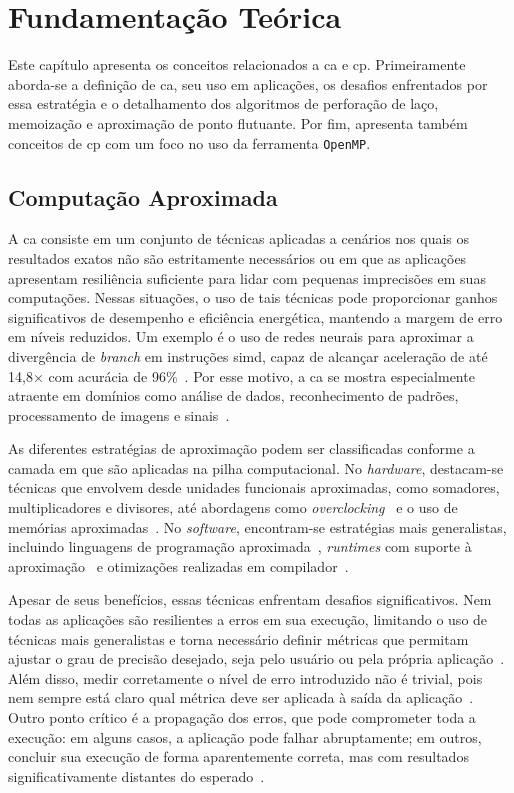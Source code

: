 \chapter{Fundamentaç\~ao Te\'orica}\label{cap:fundamentacaoTeorica}

Este capítulo apresenta os conceitos relacionados a \gls{ca} e \gls{cp}. Primeiramente aborda-se a definição de \gls{ca}, seu uso em aplicações, os desafios enfrentados por essa estratégia e o detalhamento dos algoritmos de perforação de laço, memoização e aproximação de ponto flutuante. Por fim, apresenta também conceitos de \gls{cp} com um foco no uso da ferramenta \texttt{OpenMP}.

\section{Computação Aproximada}\label{sec:compAprox}

A \gls{ca} consiste em um conjunto de técnicas aplicadas a cenários nos quais os resultados exatos não são estritamente necessários ou em que as aplicações apresentam resiliência suficiente para lidar com pequenas imprecisões em suas computações. Nessas situações, o uso de tais técnicas pode proporcionar ganhos significativos de desempenho e eficiência energética, mantendo a margem de erro em níveis reduzidos. Um exemplo é o uso de redes neurais para aproximar a divergência de \textit{branch} em instruções \gls{simd}, capaz de alcançar aceleração de até 14,8$\times$ com acurácia de 96\%~\cite{grigorian2015}. Por esse motivo, a \gls{ca} se mostra especialmente atraente em domínios como análise de dados, reconhecimento de padrões, processamento de imagens e sinais~\cite{mittal2016, chippa2013}.

As diferentes estratégias de aproximação podem ser classificadas conforme a camada em que são aplicadas na pilha computacional. No \textit{hardware}, destacam-se técnicas que envolvem desde unidades funcionais aproximadas, como somadores, multiplicadores e divisores, até abordagens como \textit{overclocking}~\cite{leon2025a,leon2025b} e o uso de memórias aproximadas~\cite{fabricio2020}. No \textit{software}, encontram-se estratégias mais generalistas, incluindo linguagens de programação aproximada~\cite{sampson2015}, \textit{runtimes} com suporte à aproximação~\cite{li2018,reis2024} e otimizações realizadas em compilador~\cite{oliveira2024a,oliveira2024b}.

Apesar de seus benefícios, essas técnicas enfrentam desafios significativos. Nem todas as aplicações são resilientes a erros em sua execução, limitando o uso de técnicas mais generalistas e torna necessário definir métricas que permitam ajustar o grau de precisão desejado, seja pelo usuário ou pela própria aplicação~\cite{mittal2016}. Além disso, medir corretamente o nível de erro introduzido não é trivial, pois nem sempre está claro qual métrica deve ser aplicada à saída da aplicação~\cite{felzmann2021}. Outro ponto crítico é a propagação dos erros, que pode comprometer toda a execução: em alguns casos, a aplicação pode falhar abruptamente; em outros, concluir sua execução de forma aparentemente correta, mas com resultados significativamente distantes do esperado~\cite{fabricio2020}.

